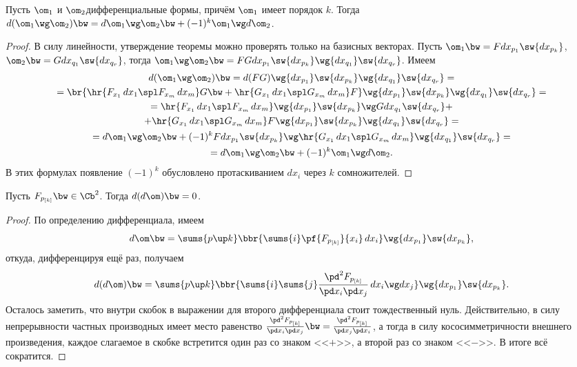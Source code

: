 \documentclass[a4paper]{article}
\newcommand{\pv}[1]{{p_{[#1]}}}
\newcommand{\di}[3]{{d {#1}_{#2_{#3}}}}
\newcommand{\pdf}[3]{\frac{\pd^2 #1}{\pd #2 \pd #3}}
\begin{document}
\begin{theorem}
Пусть $\om_1$ и $\om_2$\т дифференциальные формы, причём $\om_1$ имеет порядок $k$. Тогда $d(\om_1\wg
\om_2) \bw= d \om_1 \wg \om_2 \bw+ (-1)^k \om_1\wg d \om_2$.
\end{theorem}
\begin{proof}
В силу линейности, утверждение теоремы можно проверять только на базисных векторах. Пусть
$\om_1 \bw= F\di xp1 \sw \di xpk$, $\om_2 \bw= G\di xq1 \sw \di xqr$, тогда $\om_1\wg \om_2 \bw=
FG\di xp1\sw \di xpk\wg \di xq1\sw \di xqr$.
Имеем
\begin{multline*}
d(\om_1\wg \om_2) \bw= d(F G)\wg\di xp1 \sw \di xpk\wg \di xq1\sw \di xqr =\\=
\br{\hr{F_{x_1}\,d x_1 \spl F_{x_m}\,d x_m} G \bw+ \hr{G_{x_1}\,d x_1 \spl G_{x_m}\,d x_m}F}
\wg\di xp1\sw \di xpk\wg \di xq1\sw \di xqr=\\=
\hr{F_{x_1}\,d x_1 \spl F_{x_m}\,d x_m} \wg\di xp1\sw \di xpk\wg G \di xq1\sw \di xqr +\\+
\hr{G_{x_1}\,d x_1 \spl G_{x_m}\,d x_m}F \wg\di xp1\sw \di xpk\wg \di xq1\sw \di xqr =\\=
d \om_1 \wg \om_2 \bw+ (-1)^k F \di xp1\sw \di xpk \wg \hr{G_{x_1}\,d x_1 \spl G_{x_m}\,d x_m} \wg \di xq1\sw \di xqr =\\=
d \om_1 \wg \om_2 \bw+ (-1)^k \om_1 \wg d \om_2.
\end{multline*}
В этих формулах появление $(-1)^k$ обусловлено протаскиванием $d x_i$ через $k$ сомножителей.
\end{proof}

\begin{theorem}
Пусть $F_{\pv k} \bw\in \Cb^2$. Тогда $d(d \om) \bw= 0$.
\end{theorem}
\begin{proof}
По определению дифференциала, имеем
$$d \om \bw= \sums{p\up k} \bbr{\sums{i}\pf{F_{\pv k}}{x_i}\,d x_i }\wg \di xp1 \sw \di xpk,$$
откуда, дифференцируя ещё раз, получаем
$$d(d \om) \bw= \sums{p\up k}\bbr{\sums{i}\sums{j}\pdf{F_{\pv k}}{x_i}{x_j}\,d x_i\wg d x_j}\wg \di xp1 \sw \di xpk.$$
Осталось заметить, что внутри скобок в выражении для второго дифференциала стоит тождественный нуль. Действительно,
в силу непрерывности частных производных имеет место равенство $\pdf{F_{\pv k}}{x_i}{x_j} \bw= \pdf{F_{\pv k}}{x_j}{x_i}$,
а тогда в силу кососимметричности внешнего произведения, каждое слагаемое в скобке встретится один раз со знаком <<$+$>>,
а второй раз со знаком <<$-$>>. В итоге всё сократится.
\end{proof}
\end{document}

